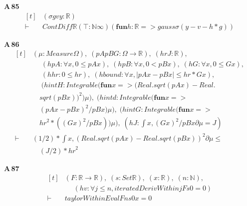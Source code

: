 \noindent\textbf{A\,85}\quad{}
{\footnotesize\[ \begin{aligned}[t]
&(\sigma \mathit{g} \mathit{v} \mathit{y} : \mathbb{R} )\\
\vdash\;&\mathit{ContDiff} \mathbb{R} (⊤ : \mathbb{N} \infty ) (\mathbf{fun} \mathit{h} : \mathbb{R} => \mathit{gauss} \sigma (\mathit{y} - \mathit{v} - \mathit{h} * \mathit{g}))
\end{aligned} \]}

\noindent\textbf{A\,86}\quad{}
{\footnotesize\[ \begin{aligned}[t]
&(\mu : \mathit{Measure} \Omega ),\; (\mathit{pA} \mathit{pB} \mathit{G} : \Omega \to \mathbb{R} ),\; (\mathit{hr} \mathit{J} : \mathbb{R} ),\\
&\quad \; (\mathit{hpA} : \forall \mathit{x}, 0 \leq \mathit{pA} \mathit{x}),\; (\mathit{hpB} : \forall \mathit{x}, 0 < \mathit{pB} \mathit{x}),\; (\mathit{hG} : \forall \mathit{x}, 0 \leq \mathit{G} \mathit{x}),\\
&\quad \; (\mathit{hhr} : 0 \leq \mathit{hr}),\; (\mathit{hbound} : \forall \mathit{x}, |\mathit{pA} \mathit{x} - \mathit{pB} \mathit{x}| \leq \mathit{hr} * \mathit{G} \mathit{x}),\\
&\quad \; (\mathit{hintH} : \mathit{Integrable} (\mathbf{fun} \mathit{x} => (\mathit{Real}.\mathit{sqrt} (\mathit{pA} \mathit{x}) - \mathit{Real}.\\
&\quad \mathit{sqrt} (\mathit{pB} \mathit{x})) ^{2}) \mu ),\; (\mathit{hintd} : \mathit{Integrable} (\mathbf{fun} \mathit{x} =>\\
&\quad (\mathit{pA} \mathit{x} - \mathit{pB} \mathit{x}) ^{2} / \mathit{pB} \mathit{x}) \mu ),\; (\mathit{hintG} : \mathit{Integrable} (\mathbf{fun} \mathit{x} =>\\
&\quad \mathit{hr} ^{2} * ((\mathit{G} \mathit{x}) ^{2} / \mathit{pB} \mathit{x})) \mu ),\; (\mathit{hJ} : \int \mathit{x}, (\mathit{G} \mathit{x}) ^{2} / \mathit{pB} \mathit{x} ∂\mu = \mathit{J})\\
\vdash\;&(1 / 2) * \int \mathit{x}, (\mathit{Real}.\mathit{sqrt} (\mathit{pA} \mathit{x}) - \mathit{Real}.\mathit{sqrt} (\mathit{pB} \mathit{x})) ^{2} ∂\mu \leq\\
&\quad (\mathit{J} / 2) * \mathit{hr} ^{2}
\end{aligned} \]}

\noindent\textbf{A\,87}\quad{}
{\footnotesize\[ \begin{aligned}[t]
&(\mathit{F} : \mathbb{R} \to \mathbb{R} ),\; (\mathit{s} : \mathit{Set} \mathbb{R} ),\; (\mathit{x} : \mathbb{R} ),\; (\mathit{n} : \mathbb{N} ),\\
&\quad \; (\mathit{hv} : \forall \mathit{j} \leq \mathit{n}, \mathit{iteratedDerivWithin} \mathit{j} \mathit{F} \mathit{s} 0 = 0)\\
\vdash\;&\mathit{taylorWithinEval} \mathit{F} \mathit{n} \mathit{s} 0 \mathit{x} = 0
\end{aligned} \]}
